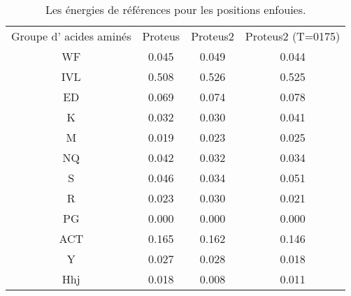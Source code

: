     \begin{table}[!htbp]
      \centering

      \begin{tabular}{cccc}

        \toprule
        Groupe d' acides aminés & Proteus & Proteus2 & Proteus2 (T=0175)\\
        \cmidrule{1-4}


        WF  & 0.045  &  0.049  & 0.044 \\
        IVL & 0.508  &  0.526  & 0.525 \\
        ED  & 0.069  &  0.074  & 0.078 \\
        K   & 0.032  &  0.030  & 0.041 \\
        M   & 0.019  &  0.023  & 0.025 \\
        NQ  & 0.042  &  0.032  & 0.034 \\
        S   & 0.046  &  0.034  & 0.051 \\
        R   & 0.023  &  0.030  & 0.021 \\
        PG  & 0.000  &  0.000  & 0.000 \\
        ACT & 0.165  &  0.162  & 0.146 \\
        Y   & 0.027  &  0.028  & 0.018 \\
        Hhj & 0.018  &  0.008  & 0.011 \\



        \bottomrule


      \end{tabular}      
      \caption{Les énergies de références pour les positions enfouies.}
\label{tab:RefEner_groupes}      
    \end{table}



